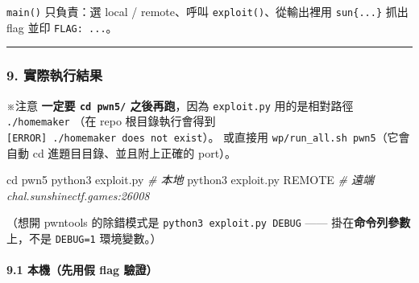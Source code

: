 \documentclass[10pt,a4paper]{article}
\newenvironment{Shaded}{\begin{snugshade}}{\end{snugshade}}
\newcommand{\BuiltInTok}[1]{#1}
\newcommand{\CommentTok}[1]{\textcolor[rgb]{0.56,0.35,0.01}{\textit{#1}}}
\newcommand{\ExtensionTok}[1]{#1}
\newcommand{\NormalTok}[1]{#1}
\renewenvironment{Shaded}{%
  \def\FrameCommand{\fboxsep=3.2pt\colorbox{shadecolor}}%
  \MakeFramed{\advance\hsize-\width\FrameRestore\small}%
}{%
  \endMakeFramed
}
\renewenvironment{quote}{%
  \begin{mdframed}[linewidth=0pt,innerleftmargin=0pt,innerrightmargin=0pt,
    innerbottommargin=0pt,innertopmargin=0pt,skipabove=0.55em,skipbelow=0.55em,
    leftmargin=0.9em,rightmargin=0.4em,startcode={\color{quotebar}\vrule width 2.6pt},%
    endcode={}]%
  \itshape\color{black}%
}{%
  \end{mdframed}%
}
\begin{document}
\texttt{main()} 只負責：選 local / remote、呼叫
\texttt{exploit()}、從輸出裡用 \texttt{sun\{\allowbreak{}...\allowbreak{}\}\allowbreak{}} 抓出 flag 並印
\texttt{FLAG:\allowbreak{}\ \allowbreak{}...}。

\begin{center}\rule{0.5\linewidth}{0.5pt}\end{center}

\subsubsection{9.
實際執行結果}\label{ux5be6ux969bux57f7ux884cux7d50ux679c-4}

\begin{quote}
※注意 \textbf{一定要 \texttt{cd\ \allowbreak{}pwn5/} 之後再跑}，因為
\texttt{exploit.\allowbreak{}py} 用的是相對路徑 \texttt{./\allowbreak{}homemaker} （在 repo
根目錄執行會得到
\texttt{{[}ERROR{]}\ \allowbreak{}\textquotesingle{}\allowbreak{}./\allowbreak{}homemaker\textquotesingle{}\allowbreak{}\ \allowbreak{}does\ \allowbreak{}not\ \allowbreak{}exist}）。
或直接用 \texttt{wp/\allowbreak{}run\_\allowbreak{}all.\allowbreak{}sh\ \allowbreak{}pwn5}（它會自動 cd
進題目目錄、並且附上正確的 port）。
\end{quote}

\begin{Shaded}
\begin{Highlighting}[]
\BuiltInTok{cd}\NormalTok{ pwn5}
\ExtensionTok{python3}\NormalTok{ exploit.py              }\CommentTok{\# 本地}
\ExtensionTok{python3}\NormalTok{ exploit.py REMOTE       }\CommentTok{\# 遠端 chal.sunshinectf.games:26008}
\end{Highlighting}
\end{Shaded}

（想開 pwntools 的除錯模式是 \texttt{python3\ \allowbreak{}exploit.\allowbreak{}py\ \allowbreak{}DEBUG} ------
掛在\textbf{命令列參數}上，不是 \texttt{DEBUG=1} 環境變數。）

\paragraph{9.1 本機（先用假 flag
驗證）}\label{ux672cux6a5fux5148ux7528ux5047-flag-ux9a57ux8b49}
\end{document}

